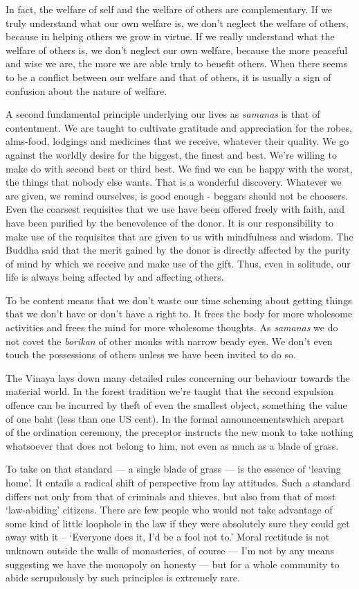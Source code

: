 In fact, the welfare of self and the welfare of others are
complementary. If we truly understand what our own welfare is, we don't
neglect the welfare of others, because in helping others we grow in
virtue. If we really understand what the welfare of others is, we don't
neglect our own welfare, because the more peaceful and wise we are, the
more we are able truly to benefit others. When there seems to be a
conflict between our welfare and that of others, it is usually a sign of
confusion about the nature of welfare.

A second fundamental principle underlying our lives as \emph{samanas} is
that of contentment. We are taught to cultivate gratitude and
appreciation for the robes, alms-food, lodgings and medicines that we
receive, whatever their quality. We go against the worldly desire for
the biggest, the finest and best. We're willing to make do with second
best or third best. We find we can be happy with the worst, the things
that nobody else wants. That is a wonderful discovery. Whatever we are
given, we remind ourselves, is good enough - beggars should not be
choosers. Even the coarsest requisites that we use have been offered
freely with faith, and have been purified by the benevolence of the
donor. It is our responsibility to make use of the requisites that are
given to us with mindfulness and wisdom. The Buddha said that the merit
gained by the donor is directly affected by the purity of mind by which
we receive and make use of the gift. Thus, even in solitude, our life is
always being affected by and affecting others.

To be content means that we don't waste our time scheming about getting
things that we don't have or don't have a right to. It frees the body
for more wholesome activities and frees the mind for more wholesome
thoughts. As \emph{samanas} we do not covet the \emph{borikan} of other
monks with narrow beady eyes. We don't even touch the possessions of
others unless we have been invited to do so.

The Vinaya lays down many detailed rules concerning our behaviour
towards the material world. In the forest tradition we're taught that
the second expulsion offence can be incurred by theft of even the
smallest object, something the value of one baht (less than one US
cent). In the formal announcementswhich arepart of the ordination
ceremony, the preceptor instructs the new monk to take nothing
whatsoever that does not belong to him, not even as much as a blade of
grass.

To take on that standard --- a single blade of grass --- is the essence
of `leaving home'. It entails a radical shift of perspective from lay
attitudes. Such a standard differs not only from that of criminals and
thieves, but also from that of most `law-abiding' citizens. There are
few people who would not take advantage of some kind of little loophole
in the law if they were absolutely sure they could get away with it --
`Everyone does it, I'd be a fool not to.' Moral rectitude is not unknown
outside the walls of monasteries, of course --- I'm not by any means
suggesting we have the monopoly on honesty --- but for a whole community
to abide scrupulously by such principles is extremely rare.

